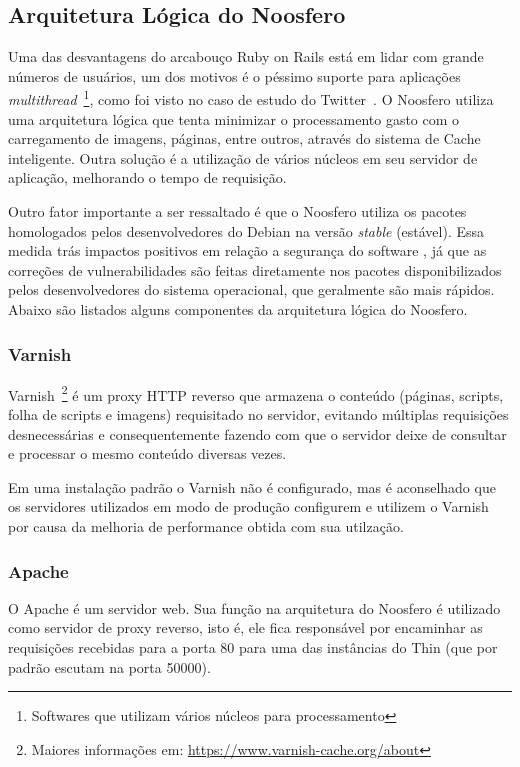 \subsection{Arquitetura Lógica do Noosfero}

Uma das desvantagens do arcabouço Ruby on Rails está em lidar com grande números de usuários, um dos motivos é o péssimo suporte para aplicações \textit{multithread}~\footnote{Softwares que utilizam vários núcleos para processamento}, como foi visto no caso de estudo do Twitter~. O Noosfero utiliza uma arquitetura lógica que tenta minimizar o processamento gasto com o carregamento de imagens, páginas, entre outros, através do sistema de Cache inteligente. Outra solução é a utilização de vários núcleos em seu servidor de aplicação, melhorando o tempo de requisição.

Outro fator importante a ser ressaltado é que o Noosfero utiliza os pacotes homologados pelos desenvolvedores do Debian na versão \textit{stable} (estável). Essa medida trás impactos positivos em relação a segurança do software , já que as correções de vulnerabilidades são feitas diretamente nos pacotes disponibilizados pelos desenvolvedores do sistema operacional, que geralmente são mais rápidos. Abaixo são listados alguns componentes da arquitetura lógica do Noosfero. %

\subsubsection*{Varnish}

Varnish~\footnote{Maiores informações em: \url{https://www.varnish-cache.org/about}} é um proxy HTTP reverso que armazena o conteúdo (páginas, scripts, folha de scripts e imagens) requisitado no servidor, evitando múltiplas requisições desnecessárias e consequentemente fazendo com que o servidor deixe de consultar e processar o mesmo conteúdo diversas vezes.

Em uma instalação padrão o Varnish não é configurado, mas é aconselhado que os servidores utilizados em modo de produção configurem e utilizem o Varnish por causa da melhoria de performance obtida com sua utilzação.

\subsubsection*{Apache}

O Apache é um servidor web. Sua função na arquitetura do Noosfero é utilizado como servidor de proxy reverso, isto é, ele fica responsável por encaminhar as requisições recebidas para a porta 80 para uma das instâncias do Thin (que por padrão escutam na porta 50000).

